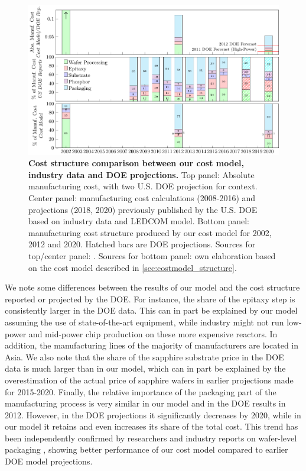 \documentclass[parskip=full]{article}
\begin{document}
\begin{figure}[h]
	\centering
    \includegraphics[width=\textwidth]{./figures/costmodel_calibration.pdf}
	\caption{\textbf{Cost structure comparison between our cost model, industry data and DOE projections.} Top panel: Absolute manufacturing cost, with two U.S. DOE projection for context. Center panel: manufacturing cost calculations (2008-2016) and projections (2018, 2020) previously published by the U.S. DOE based on industry data and LEDCOM model. Bottom panel: manufacturing cost structure produced by our cost model for 2002, 2012 and 2020. Hatched bars are DOE projections. Sources for top/center panel: \cite{doe2010solid}\cite{doe2011solid}\cite{doe2012solid}\cite{doe2013solid}\cite{doe2014solid}\cite{doe2015solid}\cite{doe2016solid}. Sources for bottom panel: own elaboration based on the cost model described in \cref{sec:costmodel_structure}.}
	\label{fig:costmodel_calibration}
\end{figure}

\textbf{}
We note some differences between the results of our model and the cost structure reported or projected by the DOE. For instance, the share of the epitaxy step is consistently larger in the DOE data. This can in part be explained by our model assuming the use of state-of-the-art equipment, while industry might not run low-power and mid-power chip production on these more expensive reactors. In addition, the manufacturing lines of the majority of manufacturers are located in Asia. We also note that the share of the sapphire substrate price in the DOE data is much larger than in our model, which can in part be explained by the overestimation of the actual price of sapphire wafers in earlier projections made for 2015-2020. Finally, the relative importance of the packaging part of the manufacturing process is very similar in our model and in the DOE results in 2012. However, in the DOE projections it significantly decreases by 2020, while in our model it retains and even increases its share of the total cost. This trend has been independently confirmed by researchers and industry reports on wafer-level packaging \cite{Lee2011WPL,Xie2013,ledsmag2017WLP}, showing better performance of our cost model compared to earlier DOE model projections.
\end{document}
